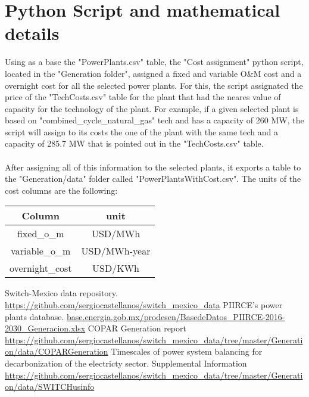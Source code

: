 \documentclass[letterpaper,12pt]{article}
\begin{document}
\section{Python Script and mathematical details}
Using as a base the "PowerPlants.csv" table, the "Cost assignment" python script, located in the "Generation folder", assigned a fixed and variable O\&M cost and a overnight cost for all the selected power plants. For this, the script assignated the price of the "TechCosts.csv" table for the plant that had the neares value of capacity for the technology of the plant. For example, if a given selected plant is based on "combined\_cycle\_natural\_gas" tech and has a capacity of 260 MW, the script will assign to its costs the one of the plant with the same tech and a capacity of 285.7 MW that is pointed out in the "TechCosts.csv" table. 
\\
\\After assigning all of this information to the selected plants, it exports a table to the "Generation/data" folder called "PowerPlantsWithCost.csv". The units of the cost columns are the following:
\begin{center}
\begin{tabular}{|c|c|}
\hline
Column & unit \\
\hline
fixed\_o\_m & USD/MWh \\
variable\_o\_m & USD/MWh-year \\
overnight\_cost & USD/KWh \\
\hline
\end{tabular}
\end{center}
\begin{thebibliography}{9}
 Switch-Mexico data repository. \url{https://github.com/sergiocastellanos/switch_mexico_data}
PIIRCE's power plants database. \url{base.energia.gob.mx/prodesen/BasedeDatos_PIIRCE-2016-2030_Generacion.xlsx}
 COPAR Generation report \url{https://github.com/sergiocastellanos/switch_mexico_data/tree/master/Generation/data/COPARGeneration}
Timescales of power system balancing for decarbonization of the electricty sector. Supplemental Information \url{https://github.com/sergiocastellanos/switch_mexico_data/tree/master/Generation/data/SWITCHusinfo}
\end{thebibliography}
\end{document}
